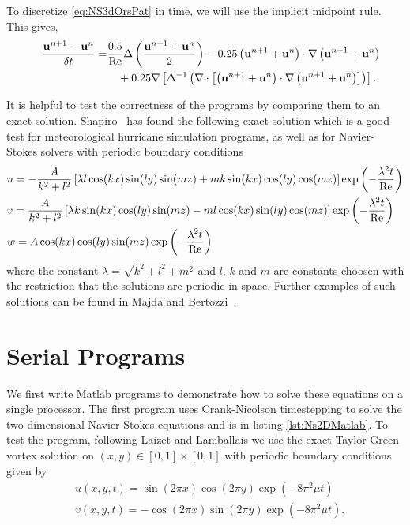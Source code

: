 To discretize \eqref{eq:NS3dOrsPat} in time, we will use the implicit midpoint rule. This gives,
\begin{align}
\hspace{1em}\frac{\mathbf u^{n+1}-\mathbf u^{n}}{\delta t} =&{}\frac{0.5}{\textup{Re}}\Delta\left( \frac{\mathbf u^{n+1}+\mathbf u^{n}}{2}\right)  - 0.25\left(\mathbf u^{n+1} + \mathbf u^{n}\right)\cdot\nabla\left(\mathbf u^{n+1} + \mathbf u^{n} \right)  \notag
\\&{}\hspace{1em} + 0.25\nabla\left[ \Delta^{-1}\left(\nabla\cdot \left[\left(\mathbf u^{n+1} + \mathbf u^{n}\right) \cdot\nabla\left(\mathbf u^{n+1} + \mathbf u^{n} \right)\right]\right)\right]. \label{eq:NS3dOrsPatIMR}
\end{align}

It is helpful to test the correctness of the programs by comparing them to an exact solution. Shapiro~\cite{Sha93} has found the following exact solution which is a good test for meteorological hurricane simulation programs, as well as for Navier-Stokes solvers with periodic boundary conditions
\begin{align*}
&{} u= -\frac{A}{k^2+l^2}\left[\lambda l\cos(kx)\sin(ly)\sin(mz)+mk\sin(kx)\cos(ly)\cos(mz) \right]\exp\left(-\frac{\lambda^2t}{\textup{Re}}\right)
\\&{} v= \frac{A}{k^2+l^2}\left[\lambda k\sin(kx)\cos(ly)\sin(mz)-ml\cos(kx)\sin(ly)\cos(mz) \right]\exp\left(-\frac{\lambda^2t}{\textup{Re}}\right)
\\&{} w= A\cos(kx)\cos(ly)\sin(mz)\exp\left(-\frac{\lambda^2t}{\textup{Re}}\right)
\end{align*}
where the constant $\lambda=\sqrt{k^2+l^2+m^2}$ and $l$, $k$ and $m$ are constants choosen with the restriction that the solutions are periodic in space. Further examples of such solutions can be found in Majda and Bertozzi~\cite[sec.~2.3]{MajBer02}.

\section{Serial Programs}
We first write Matlab programs to demonstrate how to solve these equations on a single processor. The first program uses Crank-Nicolson timestepping to solve the two-dimensional Navier-Stokes equations and is in listing \ref{lst:Ns2DMatlab}. To test the program, following Laizet and Lamballais\cite{LaiLam09} we use the exact Taylor-Green vortex solution on $(x,y)\in[0,1]\times[0,1]$ with periodic boundary conditions given by
\begin{align}
&{}u(x,y,t)=\sin(2\pi x)\cos(2\pi y)\exp(-8\pi^2\mu t)
\\&{}v(x,y,t)=-\cos(2\pi x)\sin(2\pi y)\exp(-8\pi^2\mu t).
\end{align}

